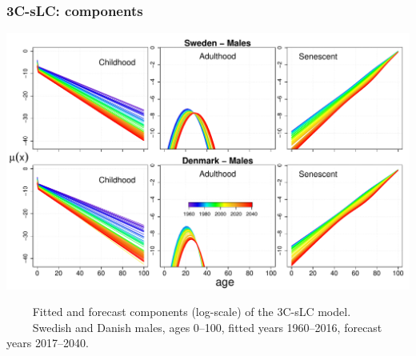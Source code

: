 \documentclass[12pt, xcolor=table]{beamer}  %
\begin{document}
\begin{frame}           
	\frametitle{3C-sLC: components}
	
	\vspace{-0.35cm}
	
	\begin{center}
	\includegraphics[scale=.42]{Figures/Ch5/RATES_FORE_M}
	
	\end{center}
	
\vspace{-0.2cm}	
\tiny{$\quad\quad$ Fitted and forecast components (log-scale) of the 3C-sLC model. \\ $\quad\quad$ Swedish and Danish males, ages 0--100, fitted years 1960--2016, forecast years 2017--2040.}	
\end{frame}

%	
%	
%	
%
%	
%	
%	
\end{document}
